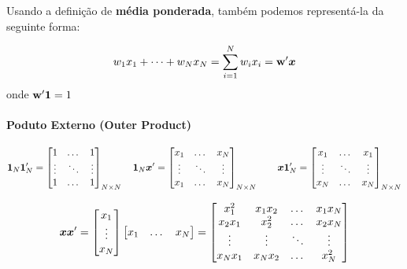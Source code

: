 \documentclass[11pt, oneside, a4paper, article]{article}
\numberwithin{equation}{section}
\begin{document}
\begin{description}
Usando a definição de \textbf{média ponderada}, também podemos representá-la da seguinte forma:

\begin{align*}
	w_{1}x_{1} + \dots + w_{N}x_{N} =
	\sum_{i=1}^{N} w_{i} x_{i} =
	\mathbf{w}'\boldsymbol{x}
\end{align*}
onde $\mathbf{w}'\boldsymbol{1}=1$

\paragraph{Poduto Externo (Outer Product)}

\begin{align*}
	\boldsymbol{1}_{N} \boldsymbol{1}_{N}' =
	\begin{bmatrix}
		1 & \dots & 1	 \\
		\vdots & \ddots & \vdots \\
		1 & \dots & 1	
	\end{bmatrix}_{N \times N}
	\quad
	\boldsymbol{1}_{N} \boldsymbol{x}' =
	\begin{bmatrix}
		x_{1} & \dots & x_{N} \\
		\vdots & \ddots & \vdots \\
		x_{1} & \dots & x_{N}	
	\end{bmatrix}_{N \times N}
	\qquad
	\boldsymbol{x} \boldsymbol{1}_{N}' =
	\begin{bmatrix}
		x_{1} & \dots & x_{1} \\
		\vdots & \ddots & \vdots \\
		x_{N} & \dots & x_{N}	
	\end{bmatrix}_{N \times N}
\end{align*}

\begin{align}\label{eq:xx:outer}
	\boldsymbol{x} \boldsymbol{x}' =
	\begin{bmatrix}
		x_{1} \\ \vdots \\ x_{N}
	\end{bmatrix}
	\begin{bmatrix}
		x_{1} & \dots & x_{N}
	\end{bmatrix}
	=
	\begin{bmatrix}
		x_{1}^{2}  & x_{1} x_{2} & \dots  & x_{1}x_{N} \\
		x_{2}x_{1} & x_{2}^2     & \dots  & x_{2}x_{N} \\
		\vdots     & \vdots      & \ddots & \vdots \\
		x_{N}x_{1} & x_{N} x_{2} & \dots  & x_{N}^{2}
	\end{bmatrix}
\end{align}


\end{description}
\end{document}
